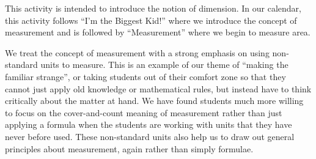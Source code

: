 \documentclass{ximera}
\begin{document}
\newpage
\begin{instructorNotes}
    This activity is intended to introduce the notion of dimension.  In our calendar, this activity follows ``I'm the Biggest Kid!'' where we introduce the concept of measurement and is followed by ``Measurement'' where we begin to measure area.
    
    We treat the concept of measurement with a strong emphasis on using non-standard units to measure.  This is an example of our theme of ``making the familiar strange'', or taking students out of their comfort zone so that they cannot just apply old knowledge or mathematical rules, but instead have to think critically about the matter at hand.  We have found students much more willing to focus on the cover-and-count meaning of measurement rather than just applying a formula when the students are working with units that they have never before used.  These non-standard units also help us to draw out general principles about measurement, again rather than simply formulae.
    

\end{instructorNotes}
\end{document}
